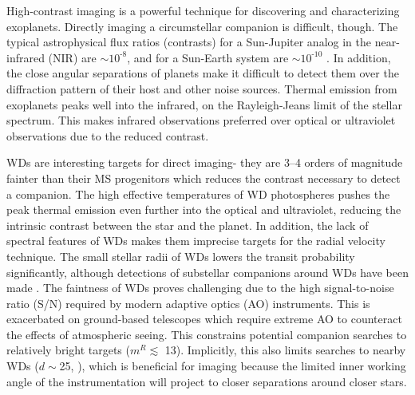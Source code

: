 \documentclass[twocolumn]{aastex631}
\begin{document}
High-contrast imaging is a powerful technique for discovering and characterizing exoplanets. Directly imaging a circumstellar companion is difficult, though. The typical astrophysical flux ratios (contrasts) for a Sun-Jupiter analog in the near-infrared (NIR) are $\sim$$10^{\text{-}8}$, and for a Sun-Earth system are $\sim$$10^{\text{-}10}$ \citep{traubDirectImagingExoplanets2010}. In addition, the close angular separations of planets make it difficult to detect them over the diffraction pattern of their host and other noise sources. Thermal emission from exoplanets peaks well into the infrared, on the Rayleigh-Jeans limit of the stellar spectrum. This makes infrared observations preferred over optical or ultraviolet observations due to the reduced contrast.

WDs are interesting targets for direct imaging- they are \numrange{3}{4} orders of magnitude fainter than their MS progenitors which reduces the contrast necessary to detect a companion. The high effective temperatures of WD photospheres pushes the peak thermal emission even further into the optical and ultraviolet, reducing the intrinsic contrast between the star and the planet. In addition, the lack of spectral features of WDs \citep{schatzmanTheorieDebitEnergie1945} makes them imprecise targets for the radial velocity technique. The small stellar radii of WDs lowers the transit probability significantly, although detections of substellar companions around WDs have been made \citep[e.g.,][]{vanderburgGiantPlanetCandidate2020}. The faintness of WDs proves challenging due to the high signal-to-noise ratio (S/N) required by modern adaptive optics (AO) instruments. This is exacerbated on ground-based telescopes which require extreme AO to counteract the effects of atmospheric seeing. This constrains potential companion searches to relatively bright targets ($m^R\lesssim$ 13). Implicitly, this also limits searches to nearby WDs ($d\sim$\qty{25}{\parsec}, \citealp{holberg25ParsecLocal2016}), which is beneficial for imaging because the limited inner working angle of the instrumentation will project to closer separations around closer stars.





\end{document}
